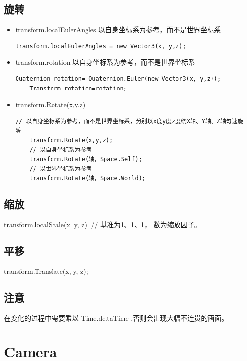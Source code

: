 \documentclass[UTF8,a4paper,12pt]{ctexbook}
\begin{document}
		\subsection{旋转}	
			\begin{itemize}
				\item transform.localEulerAngles 以自身坐标系为参考，而不是世界坐标系
					\begin{lstlisting}[xleftmargin = .02\textwidth]
	transform.localEulerAngles = new Vector3(x, y,z);
					\end{lstlisting}
				\item transform.rotation 以自身坐标系为参考，而不是世界坐标系
					\begin{lstlisting}[xleftmargin = .02\textwidth]
	Quaternion rotation= Quaternion.Euler(new Vector3(x, y,z));
	Transform.rotation=rotation;	
					\end{lstlisting}
				\item transform.Rotate(x,y,z)
					\begin{lstlisting}[xleftmargin = .02\textwidth]
	// 以自身坐标系为参考，而不是世界坐标系，分别以x度y度z度绕X轴、Y轴、Z轴匀速旋转
	transform.Rotate(x,y,z);
	// 以自身坐标系为参考
	transform.Rotate(轴，Space.Self);
	// 以世界坐标系为参考
	transform.Rotate(轴，Space.World);
					\end{lstlisting}
			\end{itemize}

		\subsection{缩放}
				transform.localScale(x, y, z); // 基准为1、1、1， 数为缩放因子。	
		\subsection{平移}
				transform.Translate(x, y, z); 
		\subsection{注意}
			在变化的过程中需要乘以 Time.deltaTime ,否则会出现大幅不连贯的画面。
	
	\section{Camera}
\end{document}
